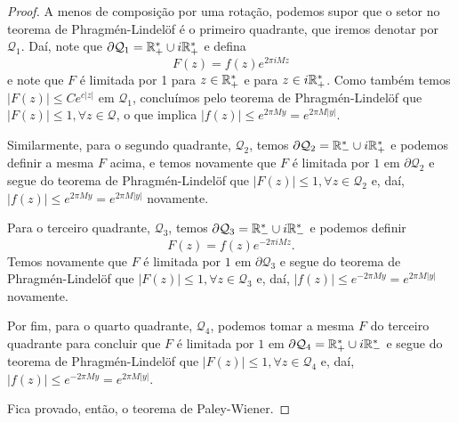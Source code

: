 \begin{proof}
            A menos de composição por uma rotação, podemos supor que
            o setor no teorema de Phragmén-Lindelöf é o primeiro quadrante,
            que iremos denotar por $\mathcal{Q}_1$. Daí, note que 
            $\partial\mathcal{Q}_1 = \mathbb{R}_+^* \cup i\mathbb{R}_+^*$ e defina
            \begin{equation*}
                F(z) = f(z)e^{2\pi i Mz}
            \end{equation*}
            e note que $F$ é limitada por 1 para $z\in\mathbb{R}_+^*$ e para
            $z\in i\mathbb{R}_+^*$. Como também temos $|F(z)| \leq Ce^{c|z|}$
            em $\mathcal{Q}_1$, concluímos pelo teorema de Phragmén-Lindelöf
            que $|F(z)| \leq 1, \forall z\in\mathcal{Q}$, o que implica
            $|f(z)| \leq e^{2\pi M y} = e^{2\pi M|y|}$.
            
            Similarmente, para o segundo quadrante, $\mathcal{Q}_2$,
            temos $\partial\mathcal{Q}_2 = \mathbb{R}_-^* \cup i\mathbb{R}_+^*$ e 
            podemos definir a mesma $F$ acima, e temos novamente que 
            $F$ é limitada por $1$ em
            $\partial\mathcal{Q}_2$ e segue do teorema de Phragmén-Lindelöf 
            que $|F(z)| \leq 1, \forall z\in\mathcal{Q}_2$ e, daí,
            $|f(z)| \leq e^{2\pi My} = e^{2\pi M|y|}$ novamente.
            
            Para o terceiro quadrante, $\mathcal{Q}_3$,
            temos $\partial\mathcal{Q}_3 = \mathbb{R}_-^* \cup i\mathbb{R}_-^*$ e 
            podemos definir 
            \begin{equation*}
                F(z) = f(z)e^{-2\pi i Mz}.
            \end{equation*}
            Temos novamente que $F$ é limitada por $1$ em
            $\partial\mathcal{Q}_3$ e segue do teorema de Phragmén-Lindelöf 
            que $|F(z)| \leq 1, \forall z\in\mathcal{Q}_3$ e, daí,
            $|f(z)| \leq e^{-2\pi My} = e^{2\pi M|y|}$ novamente.
            
            Por fim, para o quarto quadrante, $\mathcal{Q}_4$, podemos
            tomar a mesma $F$ do terceiro quadrante para concluir que 
            $F$ é limitada por $1$ em 
            $\partial\mathcal{Q}_4 = \mathbb{R}_+^* \cup i\mathbb{R}_-^*$ e segue
            do teorema de Phragmén-Lindelöf que $|F(z)| \leq 1,
            \forall z\in\mathcal{Q}_4$ e, daí, $|f(z)| \leq e^{-2\pi My}
            = e^{2\pi M|y|}$.
            
            Fica provado, então, o teorema de Paley-Wiener.
        \end{proof}
        
